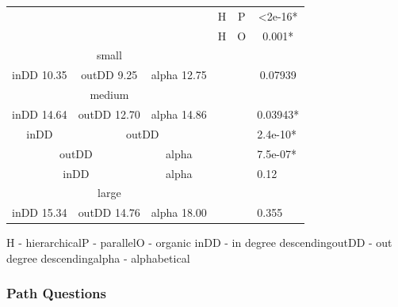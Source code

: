 \documentclass{l4proj}
\begin{document}
\begin{table}[H]
\begin{tabular}{|c|c|c|c|c|c|c|}
\multicolumn{3}{|c|}{}                    & H           & \multicolumn{2}{c|}{P}    & \textless2e-16*               \\ \cline{4-7} 
\multicolumn{3}{|c|}{}                    & H           & \multicolumn{2}{c|}{O}    & 0.001*                        \\ \hline
\multicolumn{3}{|c|}{small}               & \multicolumn{3}{c|}{\multirow{9}{*}{}}  &                               \\ \cline{1-3} \cline{7-7} 
inDD 10.35   & outDD 9.25   & alpha 12.75 & \multicolumn{3}{c|}{}                   & 0.07939                       \\ \cline{1-3} \cline{7-7} 
\multicolumn{3}{|c|}{medium}              & \multicolumn{3}{c|}{}                   &                               \\ \cline{1-3} \cline{7-7} 
inDD 14.64   & outDD 12.70  & alpha 14.86 & \multicolumn{3}{c|}{}                   & \multicolumn{1}{l|}{0.03943*} \\ \cline{1-3} \cline{7-7} 
inDD         & \multicolumn{2}{c|}{outDD} & \multicolumn{3}{c|}{}                   & \multicolumn{1}{l|}{2.4e-10*} \\ \cline{1-3} \cline{7-7} 
\multicolumn{2}{|c|}{outDD} & alpha       & \multicolumn{3}{c|}{}                   & \multicolumn{1}{l|}{7.5e-07*} \\ \cline{1-3} \cline{7-7} 
\multicolumn{2}{|c|}{inDD}  & alpha       & \multicolumn{3}{c|}{}                   & \multicolumn{1}{l|}{0.12}     \\ \cline{1-3} \cline{7-7} 
\multicolumn{3}{|c|}{large}               & \multicolumn{3}{c|}{}                   & \multicolumn{1}{l|}{}         \\ \cline{1-3} \cline{7-7} 
inDD 15.34   & outDD 14.76  & alpha 18.00 & \multicolumn{3}{c|}{}                   & \multicolumn{1}{l|}{0.355}    \\ \hline
\end{tabular}
\end{table}
\noindent H - hierarchical\newline P - parallel\newline O - organic \newline inDD - in degree descending\newline outDD - out degree descending\newline alpha - alphabetical

\subsubsection{Path Questions}
\end{document}
